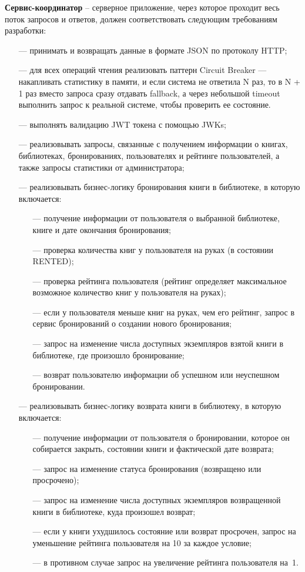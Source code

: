 \documentclass[a4paper, 12pt]{article}
\begin{document}
\begin{large}
\textbf{Сервис-координатор} -- серверное приложение, через которое проходит весь поток запросов и ответов, должен соответствовать следующим требованиям разработки:
\begin{itemize}
	\item[---] принимать и возвращать данные в формате JSON по протоколу HTTP;
	\item[---] для всех операций чтения реализовать паттерн Circuit Breaker --- накапливать статистику в памяти, и если система не ответила N раз, то в N + 1 раз вместо запроса сразу отдавать fallback, а через небольшой timeout выполнить запрос к реальной системе, чтобы проверить ее состояние.
	\item[---] выполнять валидацию JWT токена с помощью JWKs;
	\item[---] реализовывать запросы, связанные с получением информации о книгах, библиотеках, бронированиях, пользователях и рейтинге пользователей, а также запросы статистики от администратора;
	\item[---] реализовывать бизнес-логику бронирования книги в библиотеке, в которую включается:
	\begin{itemize}
        \item[---] получение информации от пользователя о выбранной библиотеке, книге и дате окончания бронирования;
        \item[---] проверка количества книг у пользователя на руках (в состоянии RENTED);
        \item[---] проверка рейтинга пользователя (рейтинг определяет максимальное возможное количество книг у пользователя на руках);
        \item[---] если у пользователя меньше книг на руках, чем его рейтинг, запрос в сервис бронирований о создании нового бронирования;
        \item[---] запрос на изменение числа доступных экземпляров взятой книги в библиотеке, где произошло бронирование;
        \item[---] возврат пользователю информации об успешном или неуспешном бронировании.
    \end{itemize}

    \item[---] реализовывать бизнес-логику возврата книги в библиотеку, в которую включается:
	\begin{itemize}
        \item[---] получение информации от пользователя о бронировании, которое он собирается закрыть, состоянии книги и фактической дате возврата;
        \item[---] запрос на изменение статуса бронирования (возвращено или просрочено);
        \item[---] запрос на изменение числа доступных экземпляров возвращенной книги в библиотеке, куда произошел возврат;
        \item[---] если у книги ухудшилось состояние или возврат просрочен, запрос на уменьшение рейтинга пользователя на 10 за каждое условие;
        \item[---] в противном случае запрос на увеличение рейтинга пользователя \mbox{на 1}.
    \end{itemize}
\end{itemize}


\end{large}
\end{document}
